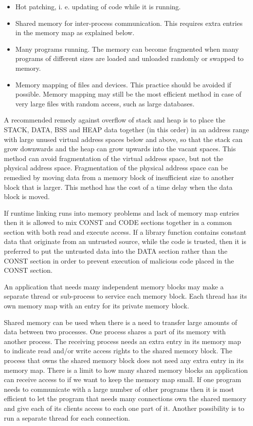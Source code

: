 \documentclass[forwardcom.tex]{subfiles}
\begin{document}
\begin{itemize}
\item Hot patching, i. e. updating of code while it is running. 

\item Shared memory for inter-process communication. This requires extra entries in the memory map as explained below.

\item Many programs running. The memory can become fragmented when many programs of different sizes are loaded and unloaded randomly or swapped to memory. 

\item Memory mapping of files and devices. This practice should be avoided if possible. Memory mapping may still be the most efficient method in case of very large files with random access, such as large databases.

\end{itemize}

A recommended remedy against overflow of stack and heap is to place the STACK, DATA, BSS and HEAP data together (in this order) in an address range with large unused virtual address spaces below and above, so that the stack can grow downwards and the heap can grow upwards into the vacant spaces. This method can avoid fragmentation of the virtual address space, but not the physical address space. Fragmentation of the physical address space can be remedied by moving data from a memory block of insufficient size to another block that is larger. This method has the cost of a time delay when the data block is moved. 
\vv

If runtime linking runs into memory problems and lack of memory map entries then it is allowed to mix CONST and CODE sections together in a common section with both read and execute access. If a library function contains constant data that originate from an untrusted source, while the code is trusted, then it is preferred to put the untrusted data into the DATA section rather than the CONST section in order to prevent execution of malicious code placed in the CONST section.
\vv

An application that needs many independent memory blocks may make a separate thread or sub-process to service each memory block. Each thread has its own memory map with an entry for its private memory block.
\vv

\label{sharedMemory} Shared memory can be used when there is a need to transfer large amounts of data between two processes. One process shares a part of its memory with another process. The receiving process needs an extra entry in its memory map to indicate read and/or write access rights to the shared memory block. The process that owns the shared memory block does not need any extra entry in its memory map. There is a limit to how many shared memory blocks an application can receive access to if we want to keep the memory map small. If one program needs to communicate with a large number of other programs then it is most efficient to let the program that needs many connections own the shared memory and give each of its clients access to each one part of it. Another possibility is to run a separate thread for each connection.
\vv
\end{document}
